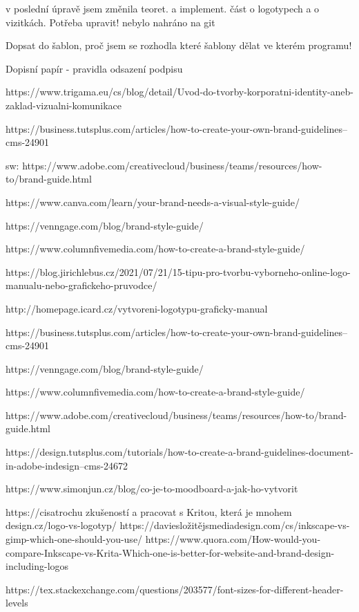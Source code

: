 v poslední úpravě jsem změnila teoret. a implement. část o logotypech a o vizitkách. Potřeba upravit!
nebylo nahráno na git

Dopsat do šablon, proč jsem se rozhodla které šablony dělat ve kterém programu!

Dopisní papír - pravidla odsazení podpisu

https://www.trigama.eu/cs/blog/detail/Uvod-do-tvorby-korporatni-identity-aneb-zaklad-vizualni-komunikace

https://business.tutsplus.com/articles/how-to-create-your-own-brand-guidelines--cms-24901



sw:
https://www.adobe.com/creativecloud/business/teams/resources/how-to/brand-guide.html

https://www.canva.com/learn/your-brand-needs-a-visual-style-guide/





https://venngage.com/blog/brand-style-guide/

https://www.columnfivemedia.com/how-to-create-a-brand-style-guide/

https://blog.jirichlebus.cz/2021/07/21/15-tipu-pro-tvorbu-vyborneho-online-logo-manualu-nebo-grafickeho-pruvodce/

http://homepage.icard.cz/vytvoreni-logotypu-graficky-manual

https://business.tutsplus.com/articles/how-to-create-your-own-brand-guidelines--cms-24901

https://venngage.com/blog/brand-style-guide/

https://www.columnfivemedia.com/how-to-create-a-brand-style-guide/

https://www.adobe.com/creativecloud/business/teams/resources/how-to/brand-guide.html

https://design.tutsplus.com/tutorials/how-to-create-a-brand-guidelines-document-in-adobe-indesign--cms-24672



https://www.simonjun.cz/blog/co-je-to-moodboard-a-jak-ho-vytvorit

https://cisatrochu zkušeností a pracovat s Kritou, která je mnohem design.cz/logo-vs-logotyp/
https://daviesložitějsmediadesign.com/cs/inkscape-vs-gimp-which-one-should-you-use/
https://www.quora.com/How-would-you-compare-Inkscape-vs-Krita-Which-one-is-better-for-website-and-brand-design-including-logos























https://tex.stackexchange.com/questions/203577/font-sizes-for-different-header-levels